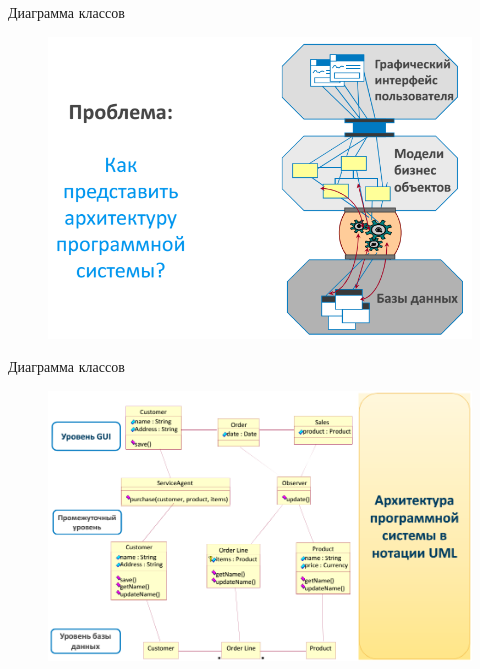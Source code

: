\documentclass{beamer}
\begin{document}
\begin{frame}[t]{Диаграмма классов}
\begin{figure}[h]
\centering
\includegraphics[scale=0.45]{images/lec03-pic14.png}
\end{figure}
\end{frame}

\begin{frame}[t]{Диаграмма классов}
\begin{figure}[h]
\centering
\includegraphics[scale=0.45]{images/lec03-pic15.png}
\end{figure}
\end{frame}
\end{document}
